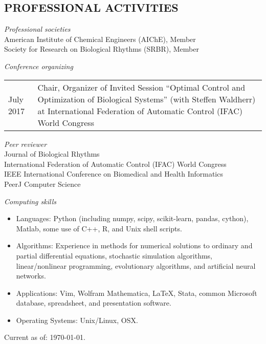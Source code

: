 \documentclass[line,10pt]{res}
\begin{document}
\begin{resume}
\section{\bf PROFESSIONAL ACTIVITIES}
\vspace{1em}
{\it Professional societies}\\[0.5em]
American Institute of Chemical Engineers (AIChE), Member\\
Society for Research on Biological Rhythms (SRBR), Member


{\it Conference organizing}\\[0.5em]
\begin{tabular}{p{0.9in} p{5.1in}}
July 2017 & Chair, Organizer of Invited Session ``Optimal Control and Optimization of Biological Systems'' (with Steffen Waldherr) at International Federation of Automatic Control (IFAC) World Congress
\end{tabular}

{\it Peer reviewer}\\[0.5em]
Journal of Biological Rhythms\\
International Federation of Automatic Control (IFAC) World Congress\\
IEEE International Conference on Biomedical and Health Informatics\\
PeerJ Computer Science



{\it Computing skills}\\
\begin{itemize}
\item Languages: Python (including numpy, scipy, scikit-learn, pandas, cython), Matlab, some use of C++, R, and Unix shell scripts.
\item Algorithms: Experience in methods for numerical solutions to ordinary and partial differential equations,
      stochastic simulation algorithms, linear/nonlinear programming, evolutionary algorithms, and artificial neural networks.
\item Applications: Vim, Wolfram Mathematica, \LaTeX, Stata, common Microsoft database, spreadsheet, and presentation software.
\item Operating Systems:  Unix/Linux, OSX.\\
\end{itemize}


\end{resume}
\null\hfill Current as of: \today.
\end{document}
